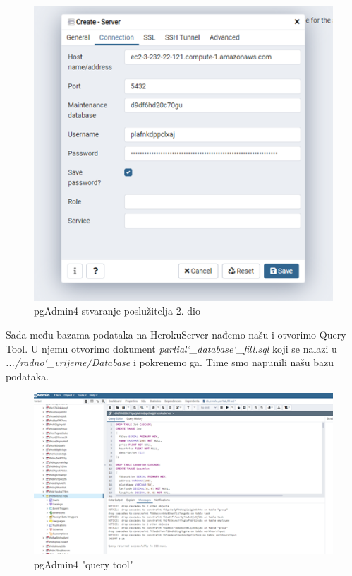				\begin{figure}[H] 					\centering 					                \includegraphics[width=\textwidth]{Dokumentacija/pogon/Picture13.png}
				\caption{pgAdmin4 stvaranje poslužitelja 2. dio}
				\end{figure}
				Sada među bazama podataka na HerokuServer nađemo našu i otvorimo Query Tool. U njemu otvorimo dokument \textit{partial\char`_database\char`_fill.sql} koji se nalazi u \textit{.../radno\char`_vrijeme/Database} i pokrenemo ga. Time smo napunili našu bazu podataka.
				\begin{figure}[H] 					\centering 					                \includegraphics[width=\textwidth]{Dokumentacija/pogon/Picture14.png}
				\caption{pgAdmin4 "query tool"}
				\end{figure}
			
			
			\eject 